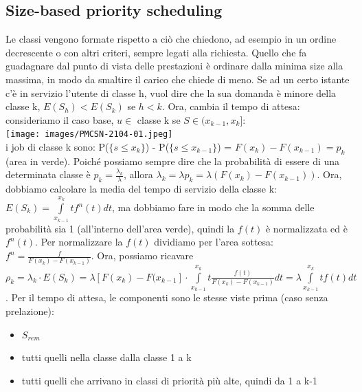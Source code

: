 \documentclass{article}
\begin{document}
\subsection{Size-based priority scheduling}
Le classi vengono formate rispetto a ciò che chiedono, ad esempio in un ordine decrescente o con altri criteri, sempre legati alla richiesta. Quello che fa guadagnare dal punto di vista delle prestazioni è ordinare dalla minima size alla massima, in modo da smaltire il carico che chiede di meno. Se ad un certo istante c'è in servizio l'utente di classe h, vuol dire che la sua domanda è minore della classe k, $E(S_h) < E(S_k)$ se $h < k$. Ora, cambia il tempo di attesa: consideriamo il caso base, $u \in$ classe k se $S \in (x_{k-1}, x_k]$:\\ 
\texttt{[image: images/PMCSN-2104-01.jpeg]}\\
i job di classe k sono: P($\{s \leq x_k\}$) - P($\{s \leq x_{k-1}\}$) = $F(x_k) - F(x_{k-1}) = p_k$ (area in verde). Poiché possiamo sempre dire che la probabilità di essere di una determinata classe è $p_k = \frac{\lambda_k}{\lambda}$, allora $\lambda_k = \lambda p_k = \lambda(F(x_k) - F(x_{k-1}))$. Ora, dobbiamo calcolare la media del tempo di servizio della classe k: $E(S_k) = \int\limits_{x_{k-1}}^{x_k} t f^n(t) dt$, ma dobbiamo fare in modo che la somma delle probabilità sia 1 (all'interno dell'area verde), quindi la $f(t)$ è normalizzata ed è $f^n(t)$. Per normalizzare la $f(t)$ dividiamo per l'area sottesa: $f^n = \frac{f}{F(x_k) - F(x_{k-1})}$. Ora, possiamo ricavare $\rho_k = \lambda_k \cdot E(S_k) = \lambda[F(x_k) - F(x_{k-1}]\cdot \int\limits_{x_{k-1}}^{x_k} t \frac{f(t)}{F(x_k)-F(x_{k-1})} dt = \lambda \int\limits_{x_{k-1}}^{x_k} t f(t) dt$. Per il tempo di attesa, le componenti sono le stesse viste prima (caso senza prelazione):
\begin{itemize}
\item $S_{rem}$
\item tutti quelli nella classe dalla classe 1 a k
\item tutti quelli che arrivano in classi di priorità più alte, quindi da 1 a k-1
\end{itemize}
\end{document}
